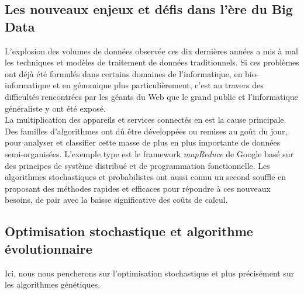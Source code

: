 \documentclass[french, 11pt]{memoir}
\begin{document}
\subsection{Les nouveaux enjeux et défis dans l'ère du Big
Data}\label{les-nouveaux-enjeux-et-duxe9fis-dans-luxe8re-du-big-data}

L'explosion des volumes de données observée ces dix dernières années a
mis à mal les techniques et modèles de traitement de données
traditionnels. Si ces problèmes ont déjà été formulés dans certains
domaines de l'informatique, en bio-informatique et en génomique plus
particulièrement, c'est au travers des difficultés rencontrées par les
géants du Web que le grand public et l'informatique généraliste y ont
été exposé. \\
La multiplication des appareils et services connectés en est la cause
principale. Des familles d'algorithmes ont dû être développées ou
remises au goût du jour, pour analyser et classifier cette masse de plus
en plus importante de données semi-organisées. L'exemple type est le
framework \emph{mapReduce\cite{dean2008mapreduce}} de Google basé sur des principes de système
distribué et de programmation fonctionnelle. Les algorithmes
stochastiques et probabilistes ont aussi connu un second souffle en
proposant des méthodes rapides et efficaces pour répondre à ces nouveaux
besoins, de pair avec la baisse significative des coûts de calcul.

\subsection{Optimisation stochastique et algorithme
évolutionnaire}\label{optimisation-stochastique-et-algorithme-uxe9volutionnaire}

Ici, nous nous pencherons sur l'optimisation stochastique et plus
précisément sur les algorithmes génétiques. 
\end{document}
